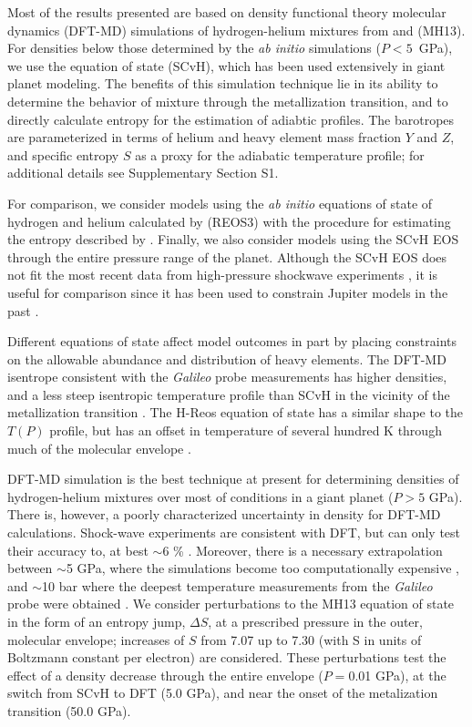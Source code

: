 Most of the results presented are based on  density functional theory molecular
dynamics (DFT-MD) simulations of hydrogen-helium mixtures from
\citet{militzer2013a} and \citet{militzer2013b} (MH13).  For densities below
those determined by the \textit{ab initio} simulations ($P<5$~GPa), we use the
\citet{saumon1995} equation of state (SCvH), which has been used extensively in
giant planet modeling. The benefits of this simulation technique lie in its
ability to determine the behavior of mixture through the metallization
transition, and to directly calculate entropy for the estimation of adiabtic
profiles. The barotropes are parameterized in
terms of helium and heavy element mass fraction $Y$ and $Z$, and specific
entropy $S$ as a proxy for the adiabatic temperature profile; for additional
details see Supplementary Section S1.

For comparison, we consider  models using the \textit{ab initio} equations of
state of hydrogen and helium calculated by \citet{becker2013}(REOS3) with the
procedure for estimating the entropy described by \citet{miguel2016}. Finally,
we also consider models using the SCvH EOS through the entire pressure range of
the planet.  Although the SCvH EOS does not fit the most recent data from
high-pressure shockwave experiments \citep{hubbard2016,miguel2016}, it is 
useful for comparison since it has been used to constrain Jupiter models
in the past \citep[e.g.][]{Saumon2004}.  

Different equations of state affect model outcomes in part by placing
constraints on the allowable abundance and distribution of heavy elements. The
DFT-MD isentrope consistent with the \textit{Galileo} probe measurements has
higher densities, and a less steep isentropic temperature profile than SCvH in
the vicinity of the metallization transition
\citep{militzer2013a,militzer2016}. The H-Reos equation of state has a similar
shape to the $T(P)$ profile, but has an offset in temperature of several
hundred K through much of the molecular envelope
\citep{Nettelmann2012,hubbard2016,miguel2016}. 

DFT-MD simulation is the best technique at present for determining
densities of hydrogen-helium mixtures over most of conditions in a giant planet
($P>5$ GPa).  There is, however, a poorly characterized uncertainty in density
for DFT-MD calculations. Shock-wave experiments are consistent with DFT, but
can only test their accuracy to, at best $\sim$6 \%
\citep{Knudson2004,Brygoo2015}.  Moreover, there is a necessary extrapolation
between $\sim$5 GPa, where the simulations become too computationally expensive
\citep{militzer2013a,militzer2013b}, and $\sim$10 bar where the deepest
temperature measurements from the \textit{Galileo} probe were obtained
\citep{Seiff1997}.  We consider perturbations to the MH13 equation of state in
the form of an entropy jump, $\Delta S$, at a prescribed pressure in the outer,
molecular envelope; increases of $S$ from 7.07 up to 7.30 (with S in units of
Boltzmann constant per electron) are considered. These perturbations test the
effect of a density decrease through the entire envelope ($P=$0.01 GPa), at the
switch from SCvH to DFT (5.0 GPa), and near the onset of the metalization
transition (50.0 GPa). 

